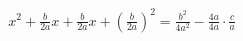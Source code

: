 \documentclass[preview]{standalone}
\begin{document}
\begin{align*}
{x}^{2} + \frac{b}{2 a} x + \frac{b}{2 a} x + {\left( \frac{b}{2 a} \right)}^{2} = \frac{{b}^{2}}{4 {a}^{2}} - \frac{4 a}{4 a} \cdot \frac{c}{a}
\end{align*}
\end{document}
